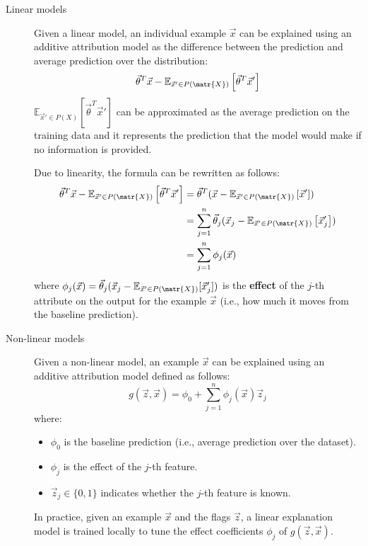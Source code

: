 \begin{description}
    \item[Linear models]
        Given a linear model, an individual example $\vec{x}$ can be explained using an additive attribution model as the difference between the prediction and average prediction over the distribution:
        \[ \vec{\theta}^T \vec{x} - \mathbb{E}_{\vec{x}' \in P(\matr{X})}\left[ \vec{\theta}^T \vec{x}' \right] \]
        $\mathbb{E}_{\vec{x}' \in P(X)}\left[ \vec{\theta}^T \vec{x}' \right]$ can be approximated as the average prediction on the training data and it represents the prediction that the model would make if no information is provided.

        Due to linearity, the formula can be rewritten as follows:
        \[ 
            \begin{split}
                \vec{\theta}^T \vec{x} - \mathbb{E}_{\vec{x}' \in P(\matr{X})}\left[ \vec{\theta}^T \vec{x}' \right] &= \vec{\theta}^T(\vec{x} - \mathbb{E}_{\vec{x}' \in P(\matr{X})}\left[ \vec{x}' \right]) \\
                &= \sum_{j=1}^{n} \vec{\theta}_j (\vec{x}_j - \mathbb{E}_{\vec{x}' \in P(\matr{X})}\left[ \vec{x}'_j \right]) \\
                &= \sum_{j=1}^{n} \phi_j(\vec{x})
            \end{split}
        \]
        where $\phi_j(\vec{x}) = \vec{\theta}_j (\vec{x}_j - \mathbb{E}_{\vec{x}' \in P(\matr{X})}[\vec{x}'_j])$ is the \textbf{effect} of the $j$-th attribute on the output for the example $\vec{x}$ (i.e., how much it moves from the baseline prediction).

    \item[Non-linear models]
        Given a non-linear model, an example $\vec{x}$ can be explained using an additive attribution model defined as follows:
        \[ g(\vec{z}, \vec{x}) = \phi_0 + \sum_{j=1}^{n} \phi_j(\vec{x}) \vec{z}_j \]
        where:
        \begin{itemize}
            \item $\phi_0$ is the baseline prediction (i.e., average prediction over the dataset).
            \item $\phi_j$ is the effect of the $j$-th feature.
            \item $\vec{z}_j \in \{ 0, 1 \}$ indicates whether the $j$-th feature is known.
        \end{itemize}

        In practice, given an example $\vec{x}$ and the flags $\vec{z}$, a linear explanation model is trained locally to tune the effect coefficients $\phi_j$ of $g(\vec{z}, \vec{x})$.


\end{description}

